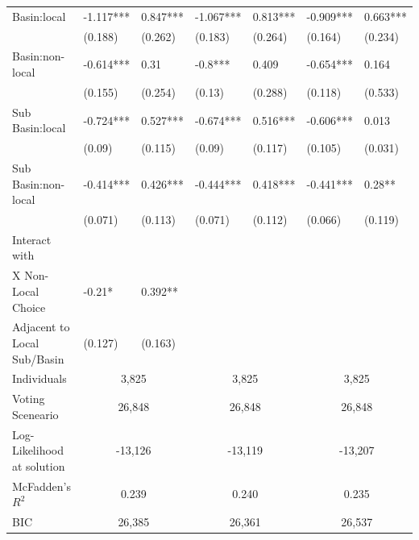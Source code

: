 {\begin{table}[H]
{\begin{tabular}{lllllll}
\hspace{0.5em} Basin:local & -1.117*** & 0.847*** & -1.067*** & 0.813*** & -0.909*** & 0.663*** \\ 
   & (0.188) & (0.262) & (0.183) & (0.264) & (0.164) & (0.234) \\ 
\hspace{0.5em} Basin:non-local & -0.614*** & 0.31 & -0.8*** & 0.409 & -0.654*** & 0.164 \\ 
   & (0.155) & (0.254) & (0.13) & (0.288) & (0.118) & (0.533) \\ 
\hspace{0.5em} Sub Basin:local & -0.724*** & 0.527*** & -0.674*** & 0.516*** & -0.606*** & 0.013 \\ 
   & (0.09) & (0.115) & (0.09) & (0.117) & (0.105) & (0.031) \\ 
\hspace{0.5em} Sub Basin:non-local & -0.414*** & 0.426*** & -0.444*** & 0.418*** & -0.441*** & 0.28** \\ 
   & (0.071) & (0.113) & (0.071) & (0.112) & (0.066) & (0.119) \\ 
Interact with \\
\hspace{0.5em} X Non-Local Choice  & -0.21* & 0.392** &  &  &  &  \\
\hspace{1.5em} Adjacent to Local Sub/Basin & (0.127) & (0.163) &  &  &  &  \\  


\midrule
Individuals & \multicolumn{2}{c}{3,825} & \multicolumn{2}{c}{3,825} & \multicolumn{2}{c}{3,825}\\
Voting Sceneario & \multicolumn{2}{c}{26,848} & \multicolumn{2}{c}{26,848} & \multicolumn{2}{c}{26,848}\\
    
Log-Likelihood at solution & \multicolumn{2}{c}{-13,126} & \multicolumn{2}{c}{-13,119} & \multicolumn{2}{c}{-13,207}\\

McFadden's $R^2$ & \multicolumn{2}{c}{0.239} & \multicolumn{2}{c}{0.240}&\multicolumn{2}{c}{0.235}\\


BIC & \multicolumn{2}{c}{26,385} & \multicolumn{2}{c}{26,361} & \multicolumn{2}{c}{26,537}\\
    

\end{tabular}}
\end{table}}
